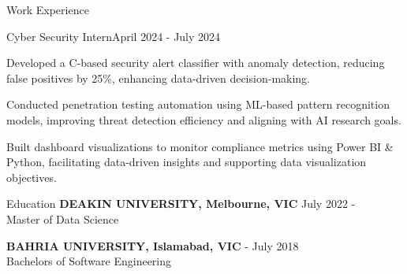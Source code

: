 \documentclass{resume} %
\begin{document}
    \begin{rSection}{Work Experience}
                    \begin{rSubsection}
                {Cyber Security Intern}{April 2024 - July 2024}
                                    {}
                                {}
                                    \item Developed a C{-}based security alert classifier with anomaly detection, reducing false positives by 25\%, enhancing data{-}driven decision{-}making.
                                    \item Conducted penetration testing automation using ML{-}based pattern recognition models, improving threat detection efficiency and aligning with AI research goals.
                                    \item Built dashboard visualizations to monitor compliance metrics using Power BI \& Python, facilitating data{-}driven insights and supporting data visualization objectives.
                            \end{rSubsection}
            \end{rSection}

\begin{rSection}{Education}
                        \textbf{DEAKIN UNIVERSITY, Melbourne, VIC} \hfill {July 2022 - } \\
                            {Master of Data Science}
                         
             
         
                        \textbf{BAHRIA UNIVERSITY, Islamabad, VIC} \hfill { - July 2018} \\
                            {Bachelors of Software Engineering}
                         
             
         
    \end{rSection}
\end{document}
